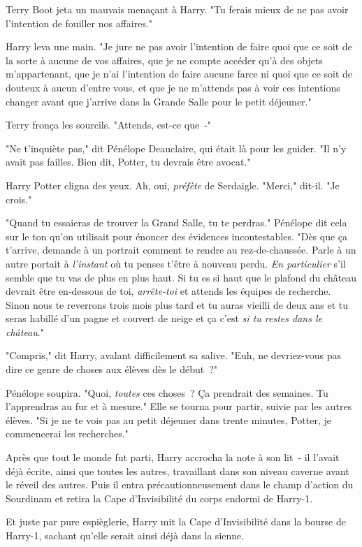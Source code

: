 Terry Boot jeta un mauvais menaçant à Harry. "Tu ferais mieux de ne pas avoir l'intention de fouiller nos affaires."

Harry leva une main. "Je jure ne pas avoir l'intention de faire quoi que ce soit de la sorte à aucune de vos affaires, que je ne compte accéder qu'à des objets m'appartenant, que je n'ai l'intention de faire aucune farce ni quoi que ce soit de douteux à aucun d'entre vous, et que je ne m'attends pas à voir ces intentions changer avant que j'arrive dans la Grande Salle pour le petit déjeuner."

Terry fronça les sourcils. "Attends, est-ce que~-"

"Ne t'inquiète pas," dit Pénélope Deauclaire, qui était là pour les guider. "Il n'y avait pas failles. Bien dit, Potter, tu devrais être avocat."

Harry Potter cligna des yeux. Ah, oui, \emph{préfète} de Serdaigle. "Merci," dit-il. "Je crois."

"Quand tu essaieras de trouver la Grand Salle, tu te perdras." Pénélope dit cela sur le ton qu'on utilisait pour énoncer des évidences incontestables. "Dès que ça t'arrive, demande à un portrait comment te rendre au rez-de-chaussée. Parle à un autre portait à \emph{l'instant} où tu penses t'être à nouveau perdu. \emph{En particulier} s'il semble que tu vas de plus en plus haut. Si tu es si haut que le plafond du château devrait être en-dessous de toi, \emph{arrête-toi} et attends les équipes de recherche. Sinon nous te reverrons trois mois plus tard et tu auras vieilli de deux ans et tu seras habillé d'un pagne et couvert de neige et ça c'est \emph{si tu restes dans le château}."

"Compris," dit Harry, avalant difficilement sa salive. "Euh, ne devriez-vous pas dire ce genre de choses aux élèves dès le début~?"

Pénélope soupira. "Quoi, \emph{toutes} ces choses~? Ça prendrait des semaines. Tu l'apprendras au fur et à mesure." Elle se tourna pour partir, suivie par les autres élèves. "Si je ne te vois pas au petit déjeuner dans trente minutes, Potter, je commencerai les recherches."

Après que tout le monde fut parti, Harry accrocha la note à son lit~- il l'avait déjà écrite, ainsi que toutes les autres, travaillant dans son niveau caverne avant le réveil des autres. Puis il entra précautionneusement dans le champ d'action du Sourdinam et retira la Cape d'Invisibilité du corps endormi de Harry-1.

Et juste par pure espièglerie, Harry mit la Cape d'Invisibilité dans la bourse de Harry-1, sachant qu'elle serait ainsi déjà dans la sienne.

